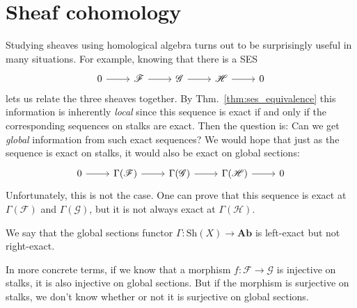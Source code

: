\documentclass[12pt]{article}
\begin{document}
\section{Sheaf cohomology}
Studying sheaves using homological algebra turns out to be surprisingly
useful in many situations. For example, knowing that there is a SES
\[
  \begin{tikzcd}
    0 \arrow{r} & \mathscr{F} \arrow{r} & \mathscr{G} \arrow{r} &
    \mathscr{H} \arrow{r} & 0
  \end{tikzcd}
\]
lets us relate the three sheaves together. By Thm.~\ref{thm:ses_equivalence}
this information is inherently \emph{local} since this sequence is exact
if and only if the corresponding sequences on stalks are exact.
Then the question is: Can we get \emph{global} information from
such exact sequences? We would hope that just as the sequence is exact
on stalks, it would also be exact on global sections:
\[
\begin{tikzcd}
  0 \arrow{r} & \Gamma(\mathscr{F}) \arrow{r} & \Gamma(\mathscr{G})
  \arrow{r} & \Gamma(\mathscr{H}) \arrow{r} & 0
\end{tikzcd}
\]
Unfortunately, this is not the case. One can prove that this sequence
is exact at $\Gamma(\mathscr{F})$ and $\Gamma(\mathscr{G})$, but it
is not always exact at $\Gamma(\mathscr{H})$.
\begin{cat}
  We say that the global sections functor $\Gamma: \text{Sh}(X)\to \textbf{Ab}$ is left-exact but not right-exact.
\end{cat}
In more concrete terms, if we know that a morphism $f: \mathscr{F}
\to\mathscr{G}$ is injective on stalks, it is also injective on
global sections. But if the morphism is surjective on stalks, we don't
know whether or not it is surjective on global sections.
\end{document}
